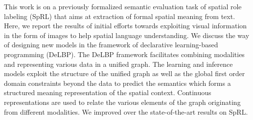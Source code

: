 This work is on a previously formalized semantic evaluation task of spatial role labeling (SpRL) that aims at extraction of formal spatial meaning from text. Here, we report the results of initial efforts towards exploiting visual information in the form of images to help spatial language understanding. We discuss the way of designing new models in the framework of declarative learning-based programming (DeLBP). The DeLBP framework facilitates combining modalities and representing various data in a unified graph. The learning and inference models exploit the structure of the unified graph as well as the global first order domain constraints beyond the data to predict the semantics which forms a structured meaning representation of the spatial context. Continuous representations are used to relate the various elements of the graph originating from different modalities. We improved over the state-of-the-art results on SpRL.
